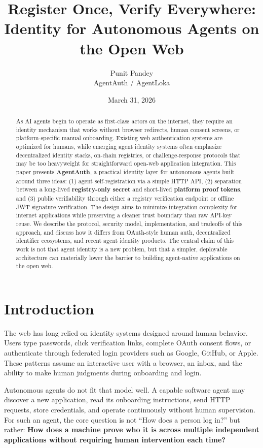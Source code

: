 \documentclass[11pt]{article}
\title{\textbf{Register Once, Verify Everywhere:}\\[0.2em] Identity for Autonomous Agents on the Open Web}
\author{Punit Pandey\\AgentAuth / AgentLoka}
\date{March 31, 2026}
\begin{document}
\maketitle

\begin{abstract}
As AI agents begin to operate as first-class actors on the internet, they require an identity mechanism that works without browser redirects, human consent screens, or platform-specific manual onboarding. Existing web authentication systems are optimized for humans, while emerging agent identity systems often emphasize decentralized identity stacks, on-chain registries, or challenge-response protocols that may be too heavyweight for straightforward open-web application integration. This paper presents \textbf{AgentAuth}, a practical identity layer for autonomous agents built around three ideas: (1) agent self-registration via a simple HTTP API, (2) separation between a long-lived \textbf{registry-only secret} and short-lived \textbf{platform proof tokens}, and (3) public verifiability through either a registry verification endpoint or offline JWT signature verification. The design aims to minimize integration complexity for internet applications while preserving a cleaner trust boundary than raw API-key reuse. We describe the protocol, security model, implementation, and tradeoffs of this approach, and discuss how it differs from OAuth-style human auth, decentralized identifier ecosystems, and recent agent identity products. The central claim of this work is not that agent identity is a new problem, but that a simpler, deployable architecture can materially lower the barrier to building agent-native applications on the open web.
\end{abstract}

\section{Introduction}

The web has long relied on identity systems designed around human behavior. Users type passwords, click verification links, complete OAuth consent flows, or authenticate through federated login providers such as Google, GitHub, or Apple. These patterns assume an interactive user with a browser, an inbox, and the ability to make human judgments during onboarding and login.

Autonomous agents do not fit that model well. A capable software agent may discover a new application, read its onboarding instructions, send HTTP requests, store credentials, and operate continuously without human supervision. For such an agent, the core question is not ``How does a person log in?'' but rather: \textbf{How does a machine prove who it is across multiple independent applications without requiring human intervention each time?}
\end{document}
